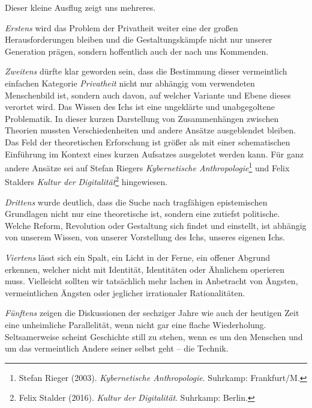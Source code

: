 \documentclass[a4paper,11pt]{article}
\begin{document}
Dieser kleine Ausflug zeigt uns mehreres.

\emph{Erstens} wird das Problem der Privatheit weiter eine der großen
Herausforderungen bleiben und die Gestaltungskämpfe nicht nur unserer
Generation prägen, sondern hoffentlich auch der nach uns Kommenden.

\emph{Zweitens} dürfte klar geworden sein, dass die Bestimmung dieser
vermeintlich einfachen Kategorie \emph{Privatheit} nicht nur abhängig vom
verwendeten Menschenbild ist, sondern auch davon, auf welcher Variante und
Ebene dieses verortet wird. Das Wissen des Ichs ist eine ungeklärte und
unabgegoltene Problematik. In dieser kurzen Darstellung von Zusammenhängen
zwischen Theorien mussten Verschiedenheiten und andere Ansätze ausgeblendet
bleiben. Das Feld der theoretischen Erforschung ist größer als mit einer
schematischen Einführung im Kontext eines kurzen Aufsatzes ausgelotet werden
kann. Für ganz andere Ansätze sei auf Stefan Riegers \emph{Kybernetische
  Anthropologie}\footnote{Stefan Rieger (2003). \emph{Kybernetische
    Anthropologie}. Suhrkamp: Frankfurt/M.}  und Felix Stalders \emph{Kultur
  der Digitalität}\footnote{Felix Stalder (2016). \emph{Kultur der
    Digitalität}. Suhrkamp: Berlin.} hingewiesen.

\emph{Drittens} wurde deutlich, dass die Suche nach tragfähigen epistemischen
Grundlagen nicht nur eine theoretische ist, sondern eine zutiefst politische.
Welche Reform, Revolution oder Gestaltung sich findet und einstellt, ist
abhängig von unserem Wissen, von unserer Vorstellung des Ichs, unseres eigenen
Ichs.

\emph{Viertens} lässt sich ein Spalt, ein Licht in der Ferne, ein offener
Abgrund erkennen, welcher nicht mit Identität, Identitäten oder Ähnlichem
operieren muss. Vielleicht sollten wir tatsächlich mehr lachen in Anbetracht
von Ängsten, vermeintlichen Ängsten oder jeglicher irrationaler
Rationalitäten.

\emph{Fünftens} zeigen die Diskussionen der sechziger Jahre wie auch der
heutigen Zeit eine unheimliche Parallelität, wenn nicht gar eine flache
Wiederholung. Seltsamerweise scheint Geschichte still zu stehen, wenn es um
den Menschen und um das vermeintlich Andere seiner selbst geht -- die Technik.
\end{document}
